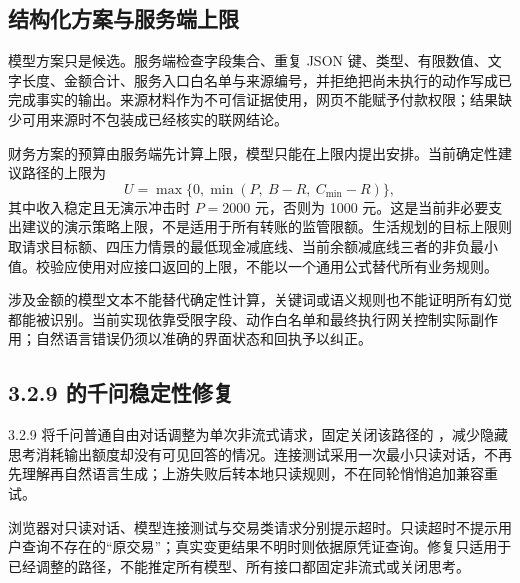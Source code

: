 \subsection{结构化方案与服务端上限}
模型方案只是候选。服务端检查字段集合、重复 JSON 键、类型、有限数值、文字长度、金额合计、服务入口白名单与来源编号，并拒绝把尚未执行的动作写成已完成事实的输出。来源材料作为不可信证据使用，网页不能赋予付款权限；结果缺少可用来源时不包装成已经核实的联网结论。

财务方案的预算由服务端先计算上限，模型只能在上限内提出安排。当前确定性建议路径的上限为
\begin{equation}
U=\max\bigl\{0,\min(P,\ B-R,\ C_{\min}-R)\bigr\},
\end{equation}
其中收入稳定且无演示冲击时 $P=2000$ 元，否则为 1000 元。这是当前非必要支出建议的演示策略上限，不是适用于所有转账的监管限额。生活规划的目标上限则取请求目标额、四压力情景的最低现金减底线、当前余额减底线三者的非负最小值。校验应使用对应接口返回的上限，不能以一个通用公式替代所有业务规则。

涉及金额的模型文本不能替代确定性计算，关键词或语义规则也不能证明所有幻觉都能被识别。当前实现依靠受限字段、动作白名单和最终执行网关控制实际副作用；自然语言错误仍须以准确的界面状态和回执予以纠正。

\subsection{3.2.9 的千问稳定性修复}
3.2.9 将千问普通自由对话调整为单次非流式请求，固定关闭该路径的 ，减少隐藏思考消耗输出额度却没有可见回答的情况。连接测试采用一次最小只读对话，不再先理解再自然语言生成；上游失败后转本地只读规则，不在同轮悄悄追加兼容重试。

浏览器对只读对话、模型连接测试与交易类请求分别提示超时。只读超时不提示用户查询不存在的“原交易”；真实变更结果不明时则依据原凭证查询。修复只适用于已经调整的路径，不能推定所有模型、所有接口都固定非流式或关闭思考。
